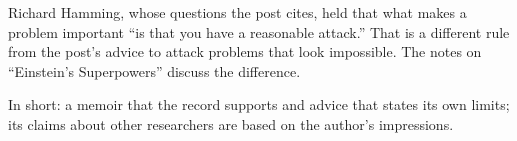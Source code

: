 \begin{afterword}
Richard Hamming, whose questions the post cites, held that what makes a problem important ``is that you have a reasonable attack.'' That is a different rule from the post's advice to attack problems that look impossible. The notes on ``Einstein's Superpowers'' discuss the difference.

In short: a memoir that the record supports and advice that states its own limits; its claims about other researchers are based on the author's impressions.
\end{afterword}
